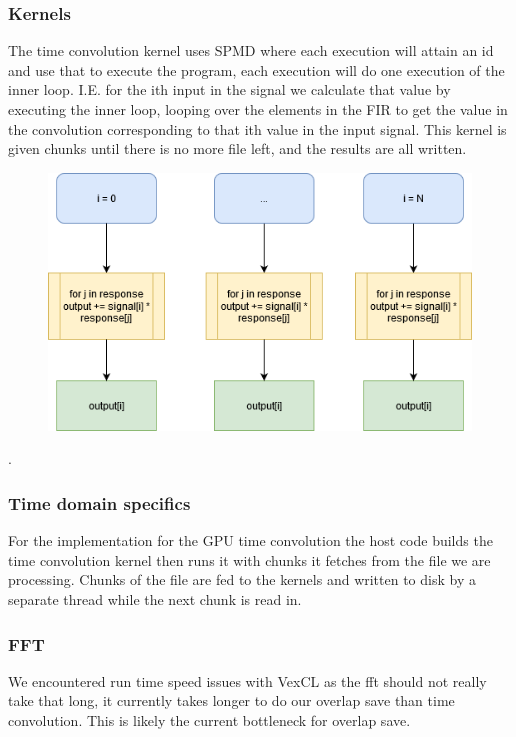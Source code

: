 \documentclass{article}
\begin{document}
\subsubsection{Kernels}

The time convolution kernel uses SPMD where each execution will attain an id and use that to execute the program, each execution will do one execution of the inner loop. I.E. for the ith input in the signal we calculate that value by executing the inner loop, looping over the elements in the FIR to get the value in the convolution corresponding to that ith value in the input signal. This kernel is given chunks until there is no more file left, and the results are all written.

\begin{figure}[!htb]
	\includegraphics[width=\linewidth]{host2.png}
	\label{fig:host2}
\end{figure}

.

\subsubsection{Time domain specifics}

For the implementation for the GPU time convolution the host code builds the time convolution kernel  then runs it with chunks it fetches from the file we are processing. Chunks of the file are fed to the kernels and written to disk by a separate thread while the next chunk is read in.

\subsubsection{FFT}

We encountered run time speed issues with VexCL as the fft should not really take that long, it currently takes longer to do our overlap save than time convolution. This is likely the current bottleneck for overlap save.
\end{document}

